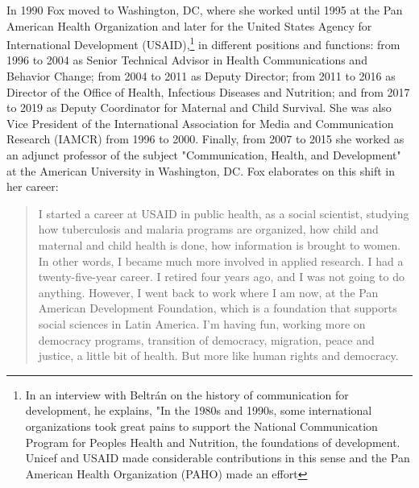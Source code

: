 \documentclass{tufte-handout}
\begin{document}
In 1990 Fox moved to Washington, DC, where she worked until 1995 at the
Pan American Health Organization and later for the United States Agency
for International Development (USAID),\footnote{In an interview with
  Beltrán on the history of communication for development, he explains,
  "In the 1980s and 1990s, some international organizations took great
  pains to support the National Communication Program for
  People\textquotesingle s Health and Nutrition, the foundations of
  development. Unicef and USAID made considerable contributions in this
  sense and the Pan American Health Organization (PAHO) made an effort}
 in different
positions and functions: from 1996 to 2004 as Senior Technical Advisor
in Health Communications and Behavior Change; from 2004 to 2011 as
Deputy Director; from 2011 to 2016 as Director of the Office of Health,
Infectious Diseases and Nutrition; and from 2017 to 2019 as Deputy
Coordinator for Maternal and Child Survival. She was also Vice President
of the International Association for Media and Communication Research
(IAMCR) from 1996 to 2000. Finally, from 2007 to 2015 she worked as an
adjunct professor of the subject "Communication, Health, and
Development" at the American University in Washington, DC. Fox
elaborates on this shift in her career:

\begin{quote}
I started a career at USAID in public health, as a social scientist,
studying how tuberculosis and malaria programs are organized, how child
and maternal and child health is done, how information is brought to
women. In other words, I became much more involved in applied research.
I had a twenty-five-year career. I retired four years ago, and I was not
going to do anything. However, I went back to work where I am now, at
the Pan American Development Foundation, which is a foundation that
supports social sciences in Latin America. I'm having fun, working more
on democracy programs, transition of democracy, migration, peace and
justice, a little bit of health. But more like human rights and
democracy.
\end{quote}
\end{document}
